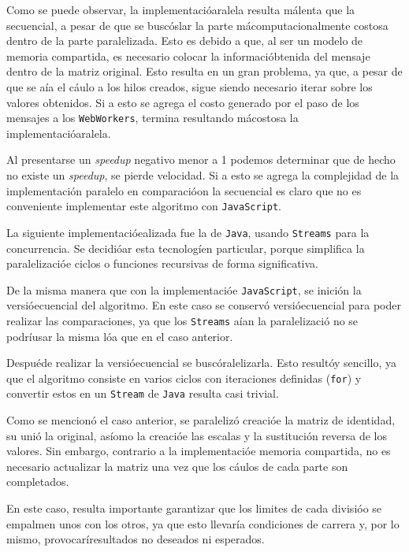 \documentclass[10pt,letterpaper,oneside]{article}
\begin{document}
{\begin{center}
\end{center}

Como se puede observar, la implementacióaralela resulta málenta que la secuencial, a pesar de que se buscóslar la parte mácomputacionalmente costosa dentro de la parte paralelizada. Esto es debido a que, al ser un modelo de memoria compartida, es necesario colocar la informacióbtenida del mensaje dentro de la matriz original. Esto resulta en un gran problema, ya que, a pesar de que se aía el cáulo a los hilos creados, sigue siendo necesario iterar sobre los valores obtenidos. Si a esto se agrega el costo generado por el paso de los mensajes a los \verb!WebWorkers!, termina resultando mácostosa la implementacióaralela.

Al presentarse un \emph{speedup} negativo menor a 1 podemos determinar que de hecho no existe un \emph{speedup}, se pierde velocidad. Si a esto se agrega la complejidad de la implementación paralelo en comparacióon la secuencial es claro que no es conveniente implementar este algoritmo con \verb!JavaScript!.

La siguiente implementacióealizada fue la de \verb!Java!, usando \verb!Streams! para la concurrencia. Se decidióar esta tecnologíen particular, porque simplifica la paralelizacióe ciclos o funciones recursivas de forma significativa.

De la misma manera que con la implementacióe \verb!JavaScript!, se inición la versióecuencial del algoritmo. En este caso se conservó versióecuencial para poder realizar las comparaciones, ya que los \verb!Streams! aían la paralelizació no se podríusar la misma lóa que en el caso anterior.

Despuéde realizar la versióecuencial se buscóralelizarla. Esto resultóy sencillo, ya que el algoritmo consiste en varios ciclos con iteraciones definidas (\verb!for!) y convertir estos en un \verb!Stream! de \verb!Java! resulta casi trivial.

Como se mencionó el caso anterior, se paralelizó creacióe la matriz de identidad, su unió la original, asíomo la creacióe las escalas y la sustitución reversa de los valores. Sin embargo, contrario a la implementacióe memoria compartida, no es necesario actualizar la matriz una vez que los cáulos de cada parte son completados.

En este caso, resulta importante garantizar que los limites de cada divisióo se empalmen unos con los otros, ya que esto llevaría condiciones de carrera y, por lo mismo, provocaríresultados no deseados ni esperados.

}
\end{document}
